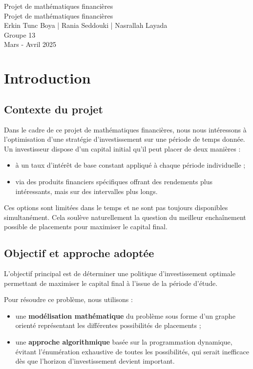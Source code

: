\documentclass[a4paper,11pt]{article}
\begin{document}
\begin{center}
	\Huge{Projet de mathématiques financières}\\[0.5cm]
	\LARGE{Projet de mathématiques financières}\\[0.2cm]
	\Large{Erkin Tunc Boya | Rania Seddouki |  Nasrallah Layada }\\ 
	\Large{Groupe 13} \\
	\Large{Mars - Avril 2025}
\end{center}

\tableofcontents
\section{Introduction}

\subsection{Contexte du projet}

Dans le cadre de ce projet de mathématiques financières, nous nous intéressons à l’optimisation d’une stratégie d’investissement sur une période de temps donnée. Un investisseur dispose d’un capital initial qu’il peut placer de deux manières :
\begin{itemize}
	\item à un taux d’intérêt de base constant appliqué à chaque période individuelle ;
	\item via des produits financiers spécifiques offrant des rendements plus intéressants, mais sur des intervalles plus longs.
\end{itemize}

Ces options sont limitées dans le temps et ne sont pas toujours disponibles simultanément. Cela soulève naturellement la question du meilleur enchaînement possible de placements pour maximiser le capital final.

\subsection{Objectif et approche adoptée}

L’objectif principal est de déterminer une politique d’investissement optimale permettant de maximiser le capital final à l’issue de la période d’étude.

Pour résoudre ce problème, nous utilisons :
\begin{itemize}
	\item une \textbf{modélisation mathématique} du problème sous forme d’un graphe orienté représentant les différentes possibilités de placements ;
	\item une \textbf{approche algorithmique} basée sur la programmation dynamique, évitant l’énumération exhaustive de toutes les possibilités, qui serait inefficace dès que l’horizon d’investissement devient important.
\end{itemize}
\end{document}
